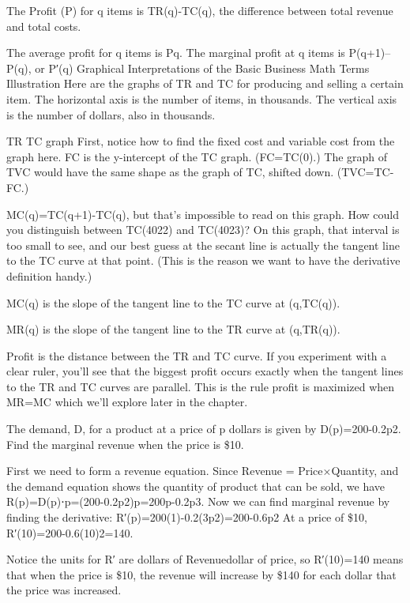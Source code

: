 The Profit (P) for q items is
TR(q)-TC(q),
the difference between total revenue and total costs.

The average profit for q items is
Pq.
The marginal profit at q items is
P(q+1)–P(q),
or
P′(q)
Graphical Interpretations of the Basic Business Math Terms
Illustration
Here are the graphs of TR and TC for producing and selling a certain item. The horizontal axis is the number of items, in thousands. The vertical axis is the number of dollars, also in thousands.

TR TC graph
First, notice how to find the fixed cost and variable cost from the graph here. FC is the y-intercept of the TC graph. (FC=TC(0).) The graph of TVC would have the same shape as the graph of TC, shifted down. (TVC=TC-FC.)

MC(q)=TC(q+1)-TC(q), but that’s impossible to read on this graph. How could you distinguish between TC(4022) and TC(4023)? On this graph, that interval is too small to see, and our best guess at the secant line is actually the tangent line to the TC curve at that point. (This is the reason we want to have the derivative definition handy.)

MC(q) is the slope of the tangent line to the TC curve at (q,TC(q)).

MR(q) is the slope of the tangent line to the TR curve at (q,TR(q)).

Profit is the distance between the TR and TC curve. If you experiment with a clear ruler, you’ll see that the biggest profit occurs exactly when the tangent lines to the TR and TC curves are parallel. This is the rule profit is maximized when MR=MC which we'll explore later in the chapter.

\begin{example}
The demand, D, for a product at a price of p dollars is given by D(p)=200-0.2p2. Find the marginal revenue when the price is \$10.

\begin{solution} First we need to form a revenue equation. Since Revenue = Price×Quantity, and the demand equation shows the quantity of product that can be sold, we have
R(p)=D(p)⋅p=(200-0.2p2)p=200p-0.2p3.
Now we can find marginal revenue by finding the derivative:
R′(p)=200(1)-0.2(3p2)=200-0.6p2
At a price of \$10, R′(10)=200-0.6(10)2=140.

Notice the units for R′ are dollars of Revenuedollar of price, so R′(10)=140 means that when the price is \$10, the revenue will increase by \$140 for each dollar that the price was increased.
\end{solution}\end{example}
